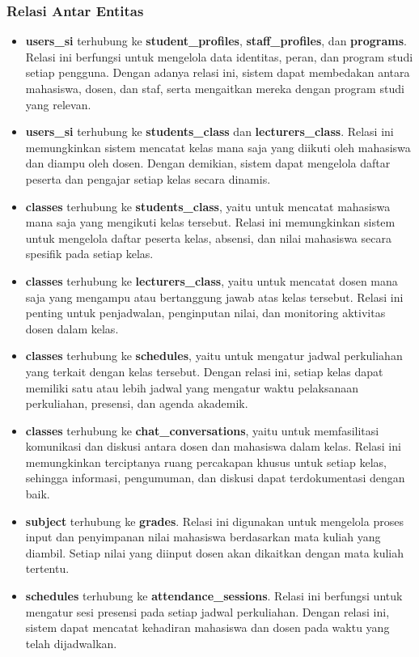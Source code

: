 \documentclass[a4paper,oneside,11pt]{book}
\begin{document}
\subsubsection{Relasi Antar Entitas}
\begin{itemize}
  \item \textbf{users\_si} terhubung ke \textbf{student\_profiles}, \textbf{staff\_profiles}, dan \textbf{programs}. Relasi ini berfungsi untuk mengelola data identitas, peran, dan program studi setiap pengguna. Dengan adanya relasi ini, sistem dapat membedakan antara mahasiswa, dosen, dan staf, serta mengaitkan mereka dengan program studi yang relevan.
  \item \textbf{users\_si} terhubung ke \textbf{students\_class} dan \textbf{lecturers\_class}. Relasi ini memungkinkan sistem mencatat kelas mana saja yang diikuti oleh mahasiswa dan diampu oleh dosen. Dengan demikian, sistem dapat mengelola daftar peserta dan pengajar setiap kelas secara dinamis.
  \item \textbf{classes} terhubung ke \textbf{students\_class}, yaitu untuk mencatat mahasiswa mana saja yang mengikuti kelas tersebut. Relasi ini memungkinkan sistem untuk mengelola daftar peserta kelas, absensi, dan nilai mahasiswa secara spesifik pada setiap kelas.
  \item \textbf{classes} terhubung ke \textbf{lecturers\_class}, yaitu untuk mencatat dosen mana saja yang mengampu atau bertanggung jawab atas kelas tersebut. Relasi ini penting untuk penjadwalan, penginputan nilai, dan monitoring aktivitas dosen dalam kelas.
  \item \textbf{classes} terhubung ke \textbf{schedules}, yaitu untuk mengatur jadwal perkuliahan yang terkait dengan kelas tersebut. Dengan relasi ini, setiap kelas dapat memiliki satu atau lebih jadwal yang mengatur waktu pelaksanaan perkuliahan, presensi, dan agenda akademik.
  \item \textbf{classes} terhubung ke \textbf{chat\_conversations}, yaitu untuk memfasilitasi komunikasi dan diskusi antara dosen dan mahasiswa dalam kelas. Relasi ini memungkinkan terciptanya ruang percakapan khusus untuk setiap kelas, sehingga informasi, pengumuman, dan diskusi dapat terdokumentasi dengan baik.
  \item \textbf{subject} terhubung ke \textbf{grades}. Relasi ini digunakan untuk mengelola proses input dan penyimpanan nilai mahasiswa berdasarkan mata kuliah yang diambil. Setiap nilai yang diinput dosen akan dikaitkan dengan mata kuliah tertentu.
  \item \textbf{schedules} terhubung ke \textbf{attendance\_sessions}. Relasi ini berfungsi untuk mengatur sesi presensi pada setiap jadwal perkuliahan. Dengan relasi ini, sistem dapat mencatat kehadiran mahasiswa dan dosen pada waktu yang telah dijadwalkan.

\end{itemize}
\end{document}
